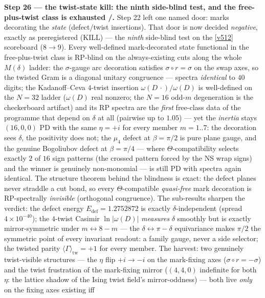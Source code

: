 
\par\smallskip\noindent\textbf{Step 26 --- the twist-state kill: the ninth side-blind test,
and the free-plus-twist class is exhausted \mE/\mO.} Step 22 left one named door: marks
decorating the \emph{state} (defect/twist insertions). That door is now decided
\emph{negative}, exactly as preregistered (KILL) --- the \emph{ninth} side-blind test on the
\vref{v512} scoreboard ($8\to9$). Every well-defined mark-decorated state functional in the
free-plus-twist class is RP-blind on the always-existing cuts along the whole $M(\delta)$
ladder: the $\sigma$-gauge arc decoration satisfies $\sigma\circ r = \sigma$ on the swap
axes, so the twisted Gram is a diagonal unitary congruence --- spectra \emph{identical} to
$40$ digits; the Kadanoff--Ceva $4$-twist insertion $\omega(D\,\cdot)/\omega(D)$ is
well-defined on the $N = 32$ ladder ($\omega(D)$ real nonzero; the $N = 16$ odd-$m$
degeneration is the checkerboard artifact) and its RP spectra are the \emph{first} free-class
data of the programme that depend on $\delta$ at all (pairwise up to $1.05$) --- yet the
\emph{inertia} stays $(16,0,0)$ PD with the same $\eta = +i$ for every member $m = 1..7$: the
decoration sees $\delta$, the positivity does not; the $\mu_4$ defect at $\beta = \pi/2$ is
pure plane gauge, and the genuine Bogoliubov defect at $\beta = \pi/4$ --- where
$\Theta$-compatibility selects exactly $2$ of $16$ sign patterns (the crossed pattern forced
by the NS wrap signs) and the winner is genuinely non-monomial --- is still PD with spectra
again identical. The structure theorem behind the blindness is exact: the defect planes never
straddle a cut bond, so every $\Theta$-compatible \emph{quasi-free} mark decoration is
RP-spectrally \emph{invisible} (orthogonal congruence). The sub-results sharpen the verdict:
the defect energy $E_{\mathrm{def}} = 1.2752872$ is exactly $\delta$-independent (spread
$4\times10^{-40}$); the $4$-twist Casimir $\ln|\omega(D)|$ \emph{measures} $\delta$ smoothly
but is exactly mirror-symmetric under $m \leftrightarrow 8-m$ --- the $\delta \leftrightarrow
\pi - \delta$ equivariance makes $\pi/2$ the symmetric point of every invariant readout: a
family gauge, never a side selector; the twisted parity $\langle\Gamma\rangle_{\mathrm{tw}} =
+1$ for every member. The harvest: two genuinely twist-visible structures --- the $\eta$ flip
$+i \to -i$ on the mark-fixing axes ($\sigma\circ r = -\sigma$) and the twist frustration of
the mark-fixing mirror ($(4,4,0)$ indefinite for both $\eta$: the lattice shadow of the Ising
twist field's mirror-oddness) --- both live \emph{only} on the fixing axes existing iff
